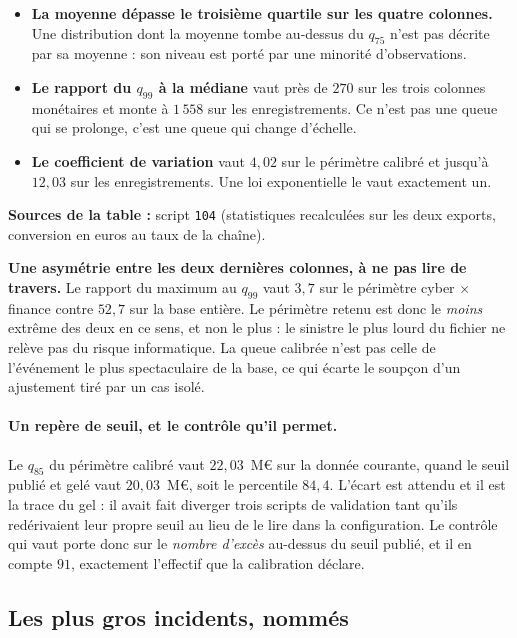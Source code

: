 \begin{itemize}[leftmargin=1.4em,itemsep=3pt]
\item \textbf{La moyenne dépasse le troisième quartile sur les quatre colonnes.} Une
      distribution dont la moyenne tombe au-dessus du $q_{75}$ n'est pas décrite par sa moyenne :
      son niveau est porté par une minorité d'observations.
\item \textbf{Le rapport du $q_{99}$ à la médiane} vaut près de $270$ sur les trois colonnes
      monétaires et monte à $1\,558$ sur les enregistrements. Ce n'est pas une queue qui se
      prolonge, c'est une queue qui change d'échelle.
\item \textbf{Le coefficient de variation} vaut $4{,}02$ sur le périmètre calibré et jusqu'à
      $12{,}03$ sur les enregistrements. Une loi exponentielle le vaut exactement un.
\end{itemize}

\noindent\textbf{Sources de la table :} script \texttt{104} (statistiques recalculées sur les
deux exports, conversion en euros au taux de la chaîne).

\begin{attention}
\textbf{Une asymétrie entre les deux dernières colonnes, à ne pas lire de travers.} Le rapport
du maximum au $q_{99}$ vaut $3{,}7$ sur le périmètre cyber $\times$ finance contre $52{,}7$ sur
la base entière. Le périmètre retenu est donc le \emph{moins} extrême des deux en ce sens, et non
le plus : le sinistre le plus lourd du fichier ne relève pas du risque informatique. La queue
calibrée n'est pas celle de l'événement le plus spectaculaire de la base, ce qui écarte le
soupçon d'un ajustement tiré par un cas isolé.
\end{attention}

\paragraph{Un repère de seuil, et le contrôle qu'il permet.} Le $q_{85}$ du périmètre calibré
vaut $22{,}03$~M\euro{} sur la donnée courante, quand le seuil publié et gelé vaut
$20{,}03$~M\euro, soit le percentile $84{,}4$. L'écart est attendu et il est la trace du gel : il
avait fait diverger trois scripts de validation tant qu'ils redérivaient leur propre seuil au
lieu de le lire dans la configuration. Le contrôle qui vaut porte donc sur le \emph{nombre
d'excès} au-dessus du seuil publié, et il en compte $91$, exactement l'effectif que la
calibration déclare.

\subsection{Les plus gros incidents, nommés}
\label{subsec:top-incidents}

